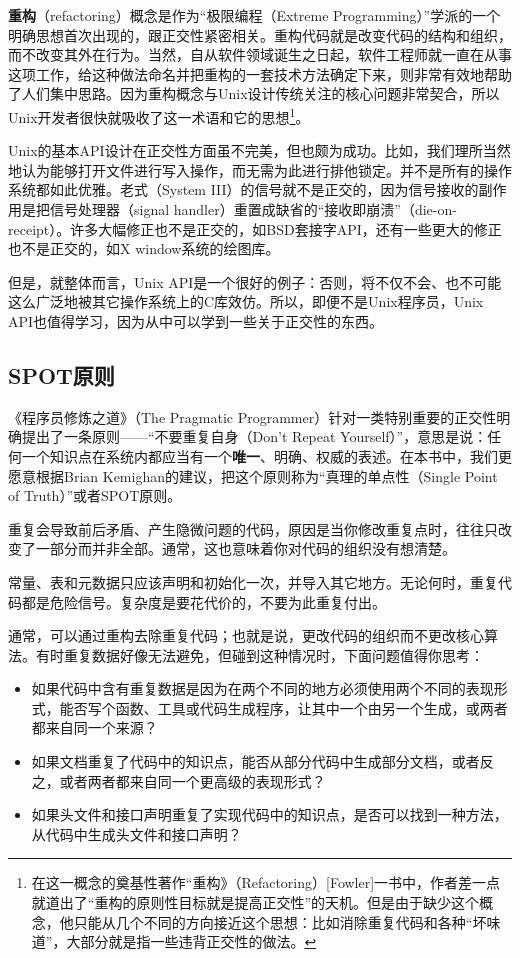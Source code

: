 \documentclass[12pt,oneside]{book}
\begin{document}
\begin{common-format}
\textbf{重构}（refactoring）概念是作为“极限编程（Extreme Programming）”学派的一个明确思想首次出现的，跟正交性紧密相关。重构代码就是改变代码的结构和组织，而不改变其外在行为。当然，自从软件领域诞生之日起，软件工程师就一直在从事这项工作，给这种做法命名并把重构的一套技术方法确定下来，则非常有效地帮助了人们集中思路。因为重构概念与Unix设计传统关注的核心问题非常契合，所以Unix开发者很快就吸收了这一术语和它的思想\footnote{在这一概念的奠基性著作“重构》（Refactoring）[Fowler]一书中，作者差一点就道出了“重构的原则性目标就是提高正交性”的天机。但是由于缺少这个概念，他只能从几个不同的方向接近这个思想：比如消除重复代码和各种“坏味道”，大部分就是指一些违背正交性的做法。}。

Unix的基本API设计在正交性方面虽不完美，但也颇为成功。比如，我们理所当然地认为能够打开文件进行写入操作，而无需为此进行排他锁定。并不是所有的操作系统都如此优雅。老式（System III）的信号就不是正交的，因为信号接收的副作用是把信号处理器（signal handler）重置成缺省的“接收即崩溃”（die-on-receipt）。许多大幅修正也不是正交的，如BSD套接字API，还有一些更大的修正也不是正交的，如X window系统的绘图库。

但是，就整体而言，Unix API是一个很好的例子：否则，将不仅不会、也不可能这么广泛地被其它操作系统上的C库效仿。所以，即便不是Unix程序员，Unix API也值得学习，因为从中可以学到一些关于正交性的东西。


\subsection{SPOT原则}
《程序员修炼之道》（The Pragmatic Programmer）针对一类特别重要的正交性明确提出了一条原则——“不要重复自身（Don't Repeat Yourself）”，意思是说：任何一个知识点在系统内都应当有一个\textbf{唯一}、明确、权威的表述。在本书中，我们更愿意根据Brian Kemighan的建议，把这个原则称为“真理的单点性（Single Point of Truth）”或者SPOT原则。

重复会导致前后矛盾、产生隐微问题的代码，原因是当你修改重复点时，往往只改变了一部分而并非全部。通常，这也意味着你对代码的组织没有想清楚。

常量、表和元数据只应该声明和初始化一次，并导入其它地方。无论何时，重复代码都是危险信号。复杂度是要花代价的，不要为此重复付出。

通常，可以通过重构去除重复代码；也就是说，更改代码的组织而不更改核心算法。有时重复数据好像无法避免，但碰到这种情况时，下面问题值得你思考：

\begin{itemize}
\item 如果代码中含有重复数据是因为在两个不同的地方必须使用两个不同的表现形式，能否写个函数、工具或代码生成程序，让其中一个由另一个生成，或两者都来自同一个来源？
\item 如果文档重复了代码中的知识点，能否从部分代码中生成部分文档，或者反之，或者两者都来自同一个更高级的表现形式？
\item 如果头文件和接口声明重复了实现代码中的知识点，是否可以找到一种方法，从代码中生成头文件和接口声明？
\end{itemize}


\end{common-format}
\end{document}
